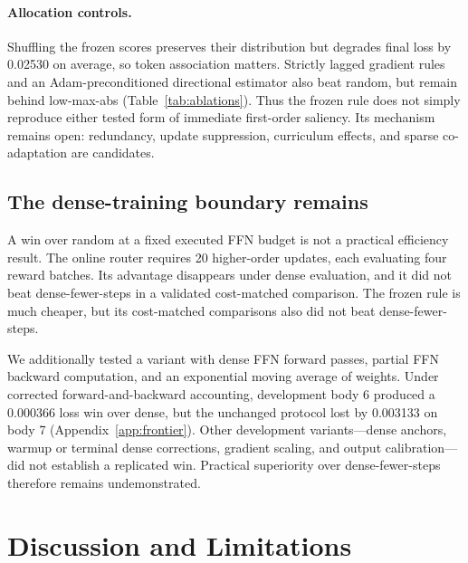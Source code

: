 \documentclass{article}
\begin{document}
\paragraph{Allocation controls.}
Shuffling the frozen scores preserves their distribution but degrades final
loss by 0.02530 on average, so token association matters. Strictly lagged
gradient rules and an Adam-preconditioned directional estimator also beat
random, but remain behind low-max-abs (Table~\ref{tab:ablations}). Thus the
frozen rule does not simply reproduce either tested form of immediate
first-order saliency. Its mechanism remains open: redundancy, update
suppression, curriculum effects, and sparse co-adaptation are candidates.

\begin{table}[H]
\centering
\caption{Development ablations on bodies 4 and 8. Values are final sparse-loss
differences relative to low-max-abs; positive values favor low-max-abs. These
are four development regimes, not independent confirmation.}
\label{tab:ablations}
{\small\allocationablationtable}
\end{table}

\subsection{The dense-training boundary remains}
\label{sec:practical}
A win over random at a fixed executed FFN budget is not a practical efficiency
result. The online router requires 20 higher-order updates, each evaluating
four reward batches. Its advantage disappears under dense evaluation, and it
did not beat dense-fewer-steps in a validated cost-matched comparison. The
frozen rule is much cheaper, but its cost-matched comparisons also did not beat
dense-fewer-steps.

We additionally tested a variant with dense FFN forward passes, partial FFN
backward computation, and an exponential moving average of weights. Under
corrected forward-and-backward accounting, development body 6 produced a
0.000366 loss win over dense, but the unchanged protocol lost by 0.003133 on
body 7 (Appendix~\ref{app:frontier}). Other development variants---dense
anchors, warmup or terminal dense corrections, gradient scaling, and output
calibration---did not establish a replicated win. Practical superiority over
dense-fewer-steps therefore remains undemonstrated.

\section{Discussion and Limitations}
\end{document}
